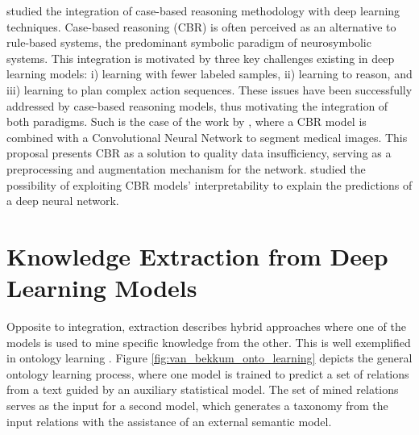 \cite{leake_bringing_2020} studied the integration of case-based reasoning methodology with deep learning techniques. Case-based reasoning (CBR) is often perceived as an alternative to rule-based systems, the predominant symbolic paradigm of neurosymbolic systems. This integration is motivated by three key challenges existing in deep learning models: i) learning with fewer labeled samples, ii) learning to reason, and iii) learning to plan complex action sequences. These issues have been successfully addressed by case-based reasoning models, thus motivating the integration of both paradigms. Such is the case of the work by \cite{marie_segmentation_2019}, where a CBR model is combined with a Convolutional Neural Network to segment medical images. This proposal presents CBR as a solution to quality data insufficiency, serving as a preprocessing and augmentation mechanism for the network. \cite{lamy_explainable_2019} studied the possibility of exploiting CBR models' interpretability to explain the predictions of a deep neural network.






\section{Knowledge Extraction from Deep Learning Models} \label{sec:sota_knowledge_extraction_dl}
Opposite to integration, extraction describes hybrid approaches where one of the models is used to mine specific knowledge from the other. This is well exemplified in ontology learning \citep{Bouraoui_Jameel_Schockaert_2017,wong_ontology_2012,asim_ontology_2018}. Figure \ref{fig:van_bekkum_onto_learning} depicts the general ontology learning process, where one model is trained to predict a set of relations from a text guided by an auxiliary statistical model. The set of mined relations serves as the input for a second model, which generates a taxonomy from the input relations with the assistance of an external semantic model. 

